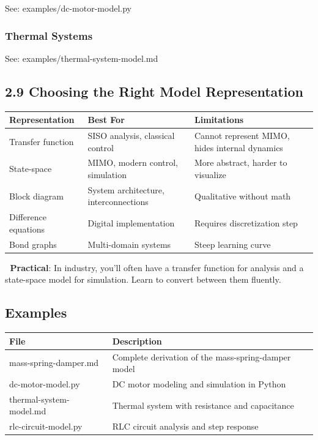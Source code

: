 \documentclass[11pt,a4paper]{book}
\begin{document}
See: examples/dc-motor-model.py

\subsubsection{Thermal Systems}

See: examples/thermal-system-model.md

\medskip\noindent\hrulefill\medskip

\subsection{2.9 Choosing the Right Model Representation}

\begin{center}
\begin{tabular}{|l|l|l|}
\hline
Representation & Best For & Limitations \\
\hline
Transfer function & SISO analysis, classical control & Cannot represent MIMO, hides internal dynamics \\
State-space & MIMO, modern control, simulation & More abstract, harder to visualize \\
Block diagram & System architecture, interconnections & Qualitative without math \\
Difference equations & Digital implementation & Requires discretization step \\
Bond graphs & Multi-domain systems & Steep learning curve \\
\hline
\end{tabular}
\end{center}

🔧 \textbf{Practical}: In industry, you'll often have a transfer function for analysis and a state-space model for simulation. Learn to convert between them fluently.

\medskip\noindent\hrulefill\medskip

\subsection{Examples}

\begin{center}
\begin{tabular}{|l|l|}
\hline
File & Description \\
\hline
mass-spring-damper.md & Complete derivation of the mass-spring-damper model \\
dc-motor-model.py & DC motor modeling and simulation in Python \\
thermal-system-model.md & Thermal system with resistance and capacitance \\
rlc-circuit-model.py & RLC circuit analysis and step response \\
\hline
\end{tabular}
\end{center}
\end{document}
